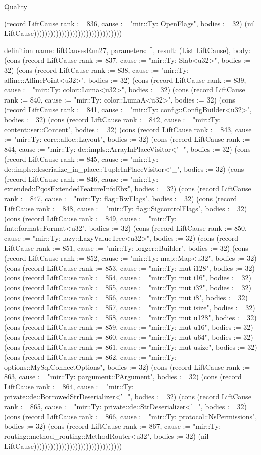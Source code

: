 \begin{lexlean}{Quality}
\begin{semanticmodule}
{(record LiftCause {rank := 836, cause := "mir::Ty: OpenFlags", bodies := 32}) (nil LiftCause))))))))))))))))))))))))))))))))
}

definition{
  name: liftCausesRun27,
  parameters: [],
  result: (List LiftCause),
  body: (cons (record LiftCause {rank := 837, cause := "mir::Ty: Slab<u32>", bodies := 32}) (cons (record LiftCause {rank := 838, cause := "mir::Ty: affine::AffinePoint<u32>", bodies := 32}) (cons (record LiftCause {rank := 839, cause := "mir::Ty: color::Luma<u32>", bodies := 32}) (cons (record LiftCause {rank := 840, cause := "mir::Ty: color::LumaA<u32>", bodies := 32}) (cons (record LiftCause {rank := 841, cause := "mir::Ty: config::ConfigBuilder<u32>", bodies := 32}) (cons (record LiftCause {rank := 842, cause := "mir::Ty: content::ser::Content", bodies := 32}) (cons (record LiftCause {rank := 843, cause := "mir::Ty: core::alloc::Layout", bodies := 32}) (cons (record LiftCause {rank := 844, cause := "mir::Ty: de::impls::ArrayInPlaceVisitor<'_", bodies := 32}) (cons (record LiftCause {rank := 845, cause := "mir::Ty: de::impls::deserialize_in_place::TupleInPlaceVisitor<'_", bodies := 32}) (cons (record LiftCause {rank := 846, cause := "mir::Ty: extended::PqosExtendedFeatureInfoEbx", bodies := 32}) (cons (record LiftCause {rank := 847, cause := "mir::Ty: flag::RwFlags", bodies := 32}) (cons (record LiftCause {rank := 848, cause := "mir::Ty: flag::SigcontrolFlags", bodies := 32}) (cons (record LiftCause {rank := 849, cause := "mir::Ty: fmt::format::Format<u32", bodies := 32}) (cons (record LiftCause {rank := 850, cause := "mir::Ty: lazy::LazyValueTree<u32>", bodies := 32}) (cons (record LiftCause {rank := 851, cause := "mir::Ty: logger::Builder", bodies := 32}) (cons (record LiftCause {rank := 852, cause := "mir::Ty: map::Map<u32", bodies := 32}) (cons (record LiftCause {rank := 853, cause := "mir::Ty: mut i128", bodies := 32}) (cons (record LiftCause {rank := 854, cause := "mir::Ty: mut i16", bodies := 32}) (cons (record LiftCause {rank := 855, cause := "mir::Ty: mut i32", bodies := 32}) (cons (record LiftCause {rank := 856, cause := "mir::Ty: mut i8", bodies := 32}) (cons (record LiftCause {rank := 857, cause := "mir::Ty: mut isize", bodies := 32}) (cons (record LiftCause {rank := 858, cause := "mir::Ty: mut u128", bodies := 32}) (cons (record LiftCause {rank := 859, cause := "mir::Ty: mut u16", bodies := 32}) (cons (record LiftCause {rank := 860, cause := "mir::Ty: mut u64", bodies := 32}) (cons (record LiftCause {rank := 861, cause := "mir::Ty: mut usize", bodies := 32}) (cons (record LiftCause {rank := 862, cause := "mir::Ty: options::MySqlConnectOptions", bodies := 32}) (cons (record LiftCause {rank := 863, cause := "mir::Ty: pargument::PArgument", bodies := 32}) (cons (record LiftCause {rank := 864, cause := "mir::Ty: private::de::BorrowedStrDeserializer<'_", bodies := 32}) (cons (record LiftCause {rank := 865, cause := "mir::Ty: private::de::StrDeserializer<'_", bodies := 32}) (cons (record LiftCause {rank := 866, cause := "mir::Ty: protocol::NsPermissions", bodies := 32}) (cons (record LiftCause {rank := 867, cause := "mir::Ty: routing::method_routing::MethodRouter<u32", bodies := 32}) (nil LiftCause))))))))))))))))))))))))))))))))
}


\end{semanticmodule}
\end{lexlean}
